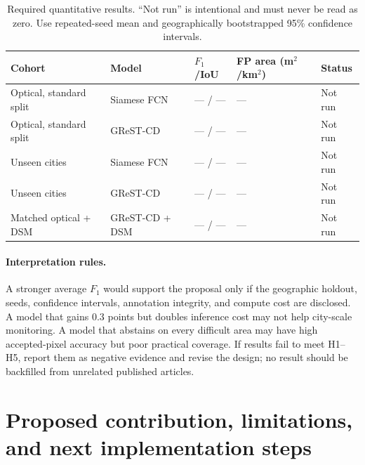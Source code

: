 \documentclass[11pt,a4paper]{article}
\newcommand{\tabhead}[1]{\textbf{#1}}
\begin{document}
\begin{table}[htbp]
\centering\small
\caption{Required quantitative results. ``Not run'' is intentional and must never be read as zero. Use repeated-seed mean and geographically bootstrapped 95\% confidence intervals.}
\label{tab:resultsplaceholder}
\begin{tabular}{@{}>{\raggedright\arraybackslash}p{}>{\raggedright\arraybackslash}p{}>{\raggedright\arraybackslash}p{}>{\raggedright\arraybackslash}p{}>{\raggedright\arraybackslash}p{}@{}}
\toprule
\tabhead{Cohort} & \tabhead{Model} & \tabhead{$F_1$/IoU} & \tabhead{FP area (m$^2$/km$^2$)} & \tabhead{Status}\\
\midrule
Optical, standard split & Siamese FCN & --- / --- & --- & Not run\\
Optical, standard split & GReST-CD & --- / --- & --- & Not run\\
Unseen cities & Siamese FCN & --- / --- & --- & Not run\\
Unseen cities & GReST-CD & --- / --- & --- & Not run\\
Matched optical + DSM & GReST-CD + DSM & --- / --- & --- & Not run\\
\bottomrule
\end{tabular}
\end{table}

\paragraph{Interpretation rules.} A stronger average $F_1$ would support the proposal only if the geographic holdout, seeds, confidence intervals, annotation integrity, and compute cost are disclosed. A model that gains 0.3 points but doubles inference cost may not help city-scale monitoring. A model that abstains on every difficult area may have high accepted-pixel accuracy but poor practical coverage. If results fail to meet H1--H5, report them as negative evidence and revise the design; no result should be backfilled from unrelated published articles.

\section{Proposed contribution, limitations, and next implementation steps}
\end{document}
